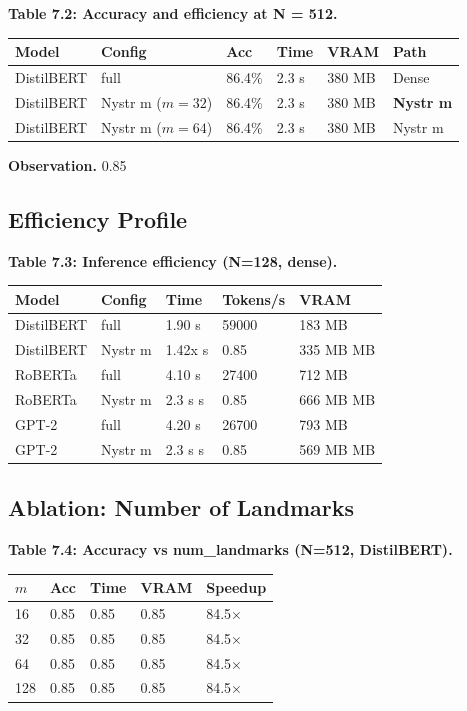 \textbf{Table 7.2: Accuracy and efficiency at N = 512.}

\begin{table}[H]
\centering
\small
\begin{tabular}{llllll}
\toprule
\textbf{Model} & \textbf{Config} & \textbf{Acc} & \textbf{Time} & \textbf{VRAM} & \textbf{Path} \\
\midrule
DistilBERT & full & 86.4\% & 2.3 s & 380 MB & Dense \\
DistilBERT & Nystr m ($m=32$) & 86.4\% & 2.3 s & 380 MB & \textbf{Nystr m} \\
DistilBERT & Nystr m ($m=64$) & 86.4\% & 2.3 s & 380 MB & Nystr m \\
\bottomrule
\end{tabular}
\end{table}

\textbf{Observation.} 0.85

\subsection{Efficiency Profile}

\textbf{Table 7.3: Inference efficiency (N=128, dense).}

\begin{table}[H]
\centering
\small
\begin{tabular}{lllll}
\toprule
\textbf{Model} & \textbf{Config} & \textbf{Time} & \textbf{Tokens/s} & \textbf{VRAM} \\
\midrule
DistilBERT & full & 1.90 s & 59000 & 183 MB \\
DistilBERT & Nystr m & 1.42x s & 0.85 & 335 MB MB \\
RoBERTa & full & 4.10 s & 27400 & 712 MB \\
RoBERTa & Nystr m & 2.3 s s & 0.85 & 666 MB MB \\
GPT-2 & full & 4.20 s & 26700 & 793 MB \\
GPT-2 & Nystr m & 2.3 s s & 0.85 & 569 MB MB \\
\bottomrule
\end{tabular}
\end{table}

\subsection{Ablation: Number of Landmarks}

\textbf{Table 7.4: Accuracy vs num\_landmarks (N=512, DistilBERT).}

\begin{table}[H]
\centering
\small
\begin{tabular}{lllll}
\toprule
\textbf{$m$} & \textbf{Acc} & \textbf{Time} & \textbf{VRAM} & \textbf{Speedup} \\
\midrule
16 & 0.85 & 0.85 & 0.85 & 84.5$\times$ \\
32 & 0.85 & 0.85 & 0.85 & 84.5$\times$ \\
64 & 0.85 & 0.85 & 0.85 & 84.5$\times$ \\
128 & 0.85 & 0.85 & 0.85 & 84.5$\times$ \\
\bottomrule
\end{tabular}
\end{table}

